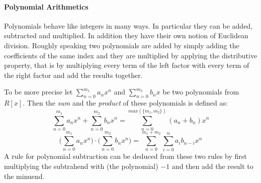 \paragraph{Polynomial Arithmetics}
Polynomials behave like integers in many ways. In particular they can be added, subtracted and multiplied. In addition they have their own notion of Euclidean division. Roughly speaking two polynomials are added by simply adding the coefficients of the same index and they are multiplied by applying the distributive property, that is by multiplying every term of the left factor with every term of the right factor and add the results together.

To be more precise let $ \sum _{n = 0} ^{m_1}{a} _{n}{x} ^{n} $ and
$ \sum _{n = 0} ^{m_2}{b} _{n}{x} $ be two polynomials from $ R[x]$. Then the \textit{sum} and the \textit{product} of these polynomials is defined as:
\begin{equation}
\sum _{n = 0} ^{m_1}{a} _{n}{x} ^{n} + \sum _{n = 0} ^{m_2}{b} _{n}{x } ^{n} = \sum _{n = 0} ^{max(\{m_1,m_2\})}{({a} _{n} +{b} _{n})}{x} ^{n}
\end{equation}
\begin{equation}
\bigg (\sum _{n = 0} ^{m_1}{a} _{n}{x} ^{n} \bigg) \cdot \bigg (\sum _{n = 0} ^{m_2 }{b} _{n}{x} ^{n} \bigg) = \sum _{n = 0} ^{m_1+m_2} \sum _{i = 0} ^{n}{a} _{i }{{b} _{n-i}}{x} ^{n}
\end{equation}
A rule for polynomial subtraction can be deduced from these two rules by first multiplying the subtrahend with (the polynomial) $-1$ and then add the result to the minuend.

